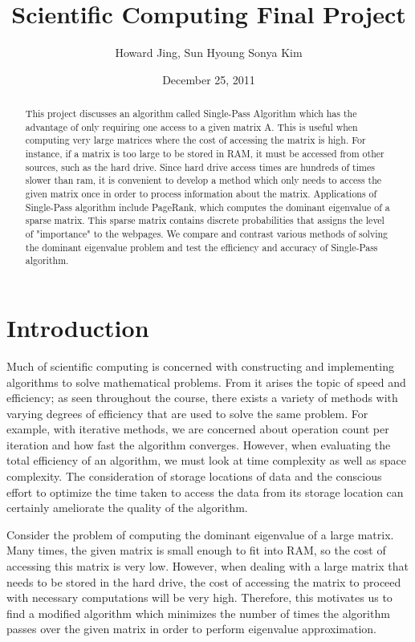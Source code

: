 \documentclass[11pt]{amsart}
\title{Scientific Computing Final Project}
\author{Howard Jing, Sun Hyoung Sonya Kim}
\date{December 25, 2011}                                           %
\begin{document}
\begin{abstract}
This project discusses an algorithm called Single-Pass Algorithm which has the advantage of only requiring one access to a given matrix A. This is useful when computing very large matrices where the cost of accessing the matrix is high. For instance, if a matrix is too large to be stored in RAM, it must be accessed from other sources, such as the hard drive. Since hard drive access times are hundreds of times slower than ram, it is convenient to develop a method which only needs to access the given matrix once in order to process information about the matrix. Applications of Single-Pass algorithm include PageRank, which computes the dominant eigenvalue of a sparse matrix. This sparse matrix contains discrete probabilities that assigns the level of "importance" to the webpages. We compare and contrast various methods of solving the dominant eigenvalue problem and test the efficiency and accuracy of Single-Pass algorithm. 

\end{abstract}
\maketitle

\section{Introduction}
Much of scientific computing is concerned with constructing and implementing algorithms to solve mathematical problems. From it arises the topic of speed and efficiency; as seen throughout the course, there exists a variety of methods with varying degrees of efficiency that are used to solve the same problem. For example, with iterative methods, we are concerned about operation count per iteration and how fast the algorithm converges. However, when evaluating the total efficiency of an algorithm, we must look at time complexity as well as space complexity. The consideration of storage locations of data and the conscious effort to optimize the time taken to access the data from its storage location can certainly ameliorate the quality of the algorithm. 

Consider the problem of computing the dominant eigenvalue of a large matrix. Many times, the given matrix is small enough to fit into RAM, so the cost of accessing this matrix is very low. However, when dealing with a large matrix that needs to be stored in the hard drive, the cost of accessing the matrix to proceed with necessary computations will be very high. Therefore, this motivates us to find a modified algorithm which minimizes the number of times the algorithm passes over the given matrix in order to perform eigenvalue approximation. 
\end{document}

